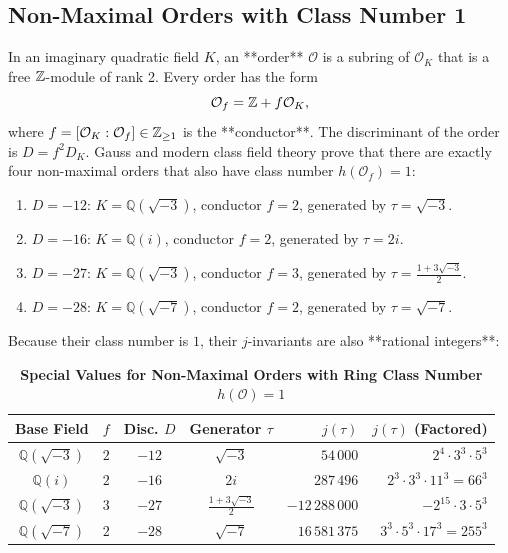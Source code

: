 \documentclass[a4paper]{article}
\begin{document}
\subsection{Non-Maximal Orders with Class Number 1}
In an imaginary quadratic field $K$, an **order** $\mathcal{O}$ is a subring of $\mathcal{O}_K$ that is a free $\mathbb{Z}$-module of rank 2. Every order has the form
\begin{equation}
 \mathcal{O}_f = \mathbb{Z} + f \mathcal{O}_K,
\end{equation}
where $f = [\mathcal{O}_K : \mathcal{O}_f] \in \mathbb{Z}_{\ge 1}$ is the **conductor**. The discriminant of the order is $D = f^2 D_K$.
Gauss and modern class field theory prove that there are exactly four non-maximal orders that also have class number $h(\mathcal{O}_f) = 1$:
\begin{enumerate}
 \item $D = -12$: $K = \mathbb{Q}(\sqrt{-3})$, conductor $f = 2$, generated by $\tau = \sqrt{-3}$.
 \item $D = -16$: $K = \mathbb{Q}(i)$, conductor $f = 2$, generated by $\tau = 2i$.
 \item $D = -27$: $K = \mathbb{Q}(\sqrt{-3})$, conductor $f = 3$, generated by $\tau = \frac{1+3\sqrt{-3}}{2}$.
 \item $D = -28$: $K = \mathbb{Q}(\sqrt{-7})$, conductor $f = 2$, generated by $\tau = \sqrt{-7}$.
\end{enumerate}
Because their class number is $1$, their $j$-invariants are also **rational integers**:

\begin{table}[htbp]
\centering
\small
\setlength{\tabcolsep}{4.5pt}
\caption{\textbf{Special Values for Non-Maximal Orders with Ring Class Number $h(\mathcal{O}) = 1$}}
\label{tab:non_maximal_h1}
\vspace{4pt}
\begin{tabular}{c c c c r r}
\toprule
Base Field & $f$ & Disc. $D$ & Generator $\tau$ & $j(\tau)$ & $j(\tau)$ (Factored) \\
\midrule
$\mathbb{Q}(\sqrt{-3})$ & $2$ & $-12$ & $\sqrt{-3}$ & $54\,000$ & $2^4 \cdot 3^3 \cdot 5^3$ \\
$\mathbb{Q}(i)$ & $2$ & $-16$ & $2i$ & $287\,496$ & $2^3 \cdot 3^3 \cdot 11^3 = 66^3$ \\
$\mathbb{Q}(\sqrt{-3})$ & $3$ & $-27$ & $\frac{1+3\sqrt{-3}}{2}$ & $-12\,288\,000$ & $-2^{15} \cdot 3 \cdot 5^3$ \\
$\mathbb{Q}(\sqrt{-7})$ & $2$ & $-28$ & $\sqrt{-7}$ & $16\,581\,375$ & $3^3 \cdot 5^3 \cdot 17^3 = 255^3$ \\
\bottomrule
\end{tabular}
\end{table}
\end{document}
